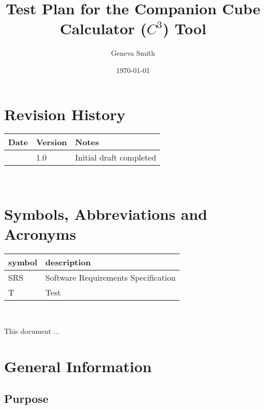 \documentclass[12pt, titlepage]{article}
\newcommand{\progname}{Companion Cube Calculator} %
\newcommand{\prognameAbbrv}{$C^{3}$}
\begin{document}
\title{Test Plan for the \progname{} (\prognameAbbrv{}) Tool} 
\author{Geneva Smith}
\date{\today}
	
\maketitle


\section{Revision History}

\begin{tabularx}{\textwidth}{p{3cm}p{2cm}X}
\toprule {\bf Date} & {\bf Version} & {\bf Notes}\\
\midrule
 & 1.0 & Initial draft completed\\
\bottomrule
\end{tabularx}

~\newpage

\section{Symbols, Abbreviations and Acronyms}

\renewcommand{\arraystretch}{1.2}
\begin{tabular}{l l} 
  \toprule		
  \textbf{symbol} & \textbf{description}\\
  \midrule 
  SRS & Software Requirements Specification\\
  T & Test\\
  \bottomrule
\end{tabular}\\


\newpage

\tableofcontents

\listoftables

\listoffigures

\newpage


This document ...

\section{General Information}

\subsection{Purpose}
\end{document}
